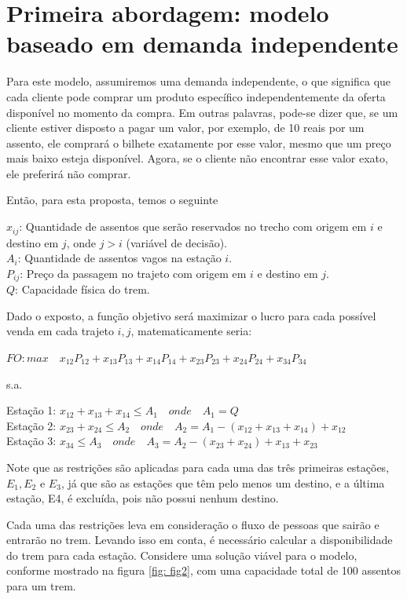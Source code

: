 \section{Primeira abordagem: modelo baseado em demanda independente}\label{sec:modelo1}

Para este modelo, assumiremos uma demanda independente, o que significa que cada cliente pode comprar um produto específico independentemente da oferta disponível no momento da compra. Em outras palavras, pode-se dizer que, se um cliente estiver disposto a pagar um valor, por exemplo, de 10 reais por um assento, ele comprará o bilhete exatamente por esse valor, mesmo que um preço mais baixo esteja disponível. Agora, se o cliente não encontrar esse valor exato, ele preferirá não comprar.

Então, para esta proposta, temos o seguinte

\noindent $x_{ij}$: Quantidade de assentos que serão reservados no trecho com origem em $i$ e destino em $j$, onde $j>i$ (variável de decisão). \\
\noindent $A_i$: Quantidade de assentos vagos na estação $i$. \\
\noindent $P_{ij}$: Preço da passagem no trajeto com origem em $i$ e destino em $j$. \\
\noindent $Q$: Capacidade física do trem.

Dado o exposto, a função objetivo será maximizar o lucro para cada possível venda em cada trajeto $i,j$, matematicamente seria:

$FO: max \quad x_{12}P_{12} + x_{13}P_{13} + x_{14}P_{14} + x_{23}P_{23} + x_{24}P_{24} + x_{34}P_{34}$

s.a.

Estação 1: $x_{12} + x_{13} + x_{14} \leq A_1 \quad onde \quad A_1 = Q $ \\
\indent Estação 2: $x_{23} + x_{24}  \leq  A_2 \quad onde \quad A_2 = A_1 - (x_{12} + x_{13} + x_{14}) + x_{12} $ \\
\indent Estação 3: $x_{34} \leq A_3 \quad onde \quad A_3 = A_2 - (x_{23} + x_{24}) + x_{13} + x_{23} $

Note que as restrições são aplicadas para cada uma das três primeiras estações, $E_1, E_2$ e $E_3$, já que são as estações que têm pelo menos um destino, e a última estação, E4, é excluída, pois não possui nenhum destino.

Cada uma das restrições leva em consideração o fluxo de pessoas que sairão e entrarão no trem. Levando isso em conta, é necessário calcular a disponibilidade do trem para cada estação. Considere uma solução viável para o modelo, conforme mostrado na figura \ref{fig: fig2}, com uma capacidade total de 100 assentos para um trem.

